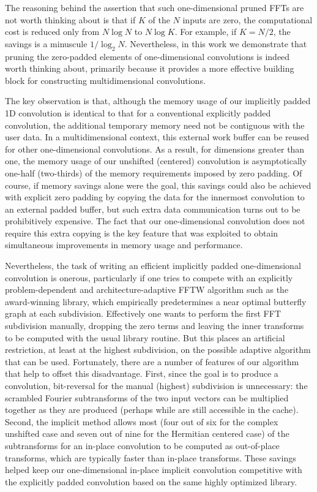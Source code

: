 \documentclass[final]{siamltex}
\begin{document}
The reasoning behind the assertion that such one-dimensional pruned FFTs
are not worth thinking about is that if $K$ of the $N$ inputs are zero,
the computational cost is reduced only from $N\log N$ to $N\log K$.
For example, if $K=N/2$, the savings is a minuscule $1/\log_2 N$.
Nevertheless, in this work we demonstrate that pruning the zero-padded
elements of one-dimensional convolutions is indeed worth thinking about,
primarily because it provides a more effective building block for constructing
multidimensional convolutions.

The key observation is that, although the memory usage of our implicitly
padded 1D convolution is identical to that for a conventional explicitly
padded convolution, the additional temporary memory need not be contiguous
with the user data.  In a multidimensional context, this external work
buffer can be reused for other one-dimensional convolutions.
As a result, for dimensions greater than one, the memory usage of our
unshifted (centered) convolution is asymptotically one-half (two-thirds)
of the memory requirements imposed by zero padding.
Of course, if memory savings alone were the goal, this savings could
also be achieved with explicit zero padding by copying the data for the
innermost convolution to an external padded buffer, but such extra data
communication turns out to be prohibitively expensive. The fact that our
one-dimensional convolution does not require this extra copying is the key
feature that was exploited to obtain simultaneous improvements in memory
usage and performance.

Nevertheless, the task of writing an efficient implicitly padded one-dimensional
convolution is onerous, particularly if one tries to compete with an
explicitly problem-dependent and architecture-adaptive FFTW algorithm such
as the award-winning \cite{FFTW} library, which empirically predetermines a
near optimal butterfly graph at each subdivision. Effectively one wants to
perform the first FFT subdivision manually, dropping the zero terms and
leaving the inner transforms to be computed with the usual library
routine. But this places an artificial restriction, at least at the highest
subdivision, on the possible adaptive algorithm that can be
used. Fortunately, there are a number of features of our algorithm that
help to offset this disadvantage. First, since the goal is to produce a
convolution, bit-reversal for the manual (highest) subdivision is
unnecessary: the scrambled Fourier subtransforms of the two input vectors
can be multiplied together as they are produced (perhaps while are still
accessible in the cache). Second, the implicit method allows most (four out
of six for the complex unshifted case and seven out of nine for the
Hermitian centered case) of the subtransforms for an in-place convolution
to be computed as out-of-place transforms, which are typically faster than
in-place transforms.  These savings helped keep our one-dimensional in-place
implicit convolution competitive with the explicitly padded convolution
based on the same highly optimized library.
\end{document}
